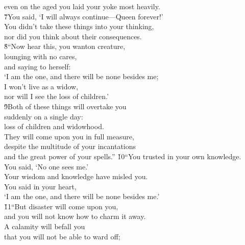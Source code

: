 \begin{poetry}
\poemlll       even on the aged you laid your yoke most heavily. \\
\poeml \v{7}You said, `I will always continue---Queen forever!' \\
\poemll    You didn't take these things into your thinking, \\
\poemlll       nor did you think about their consequences. \\
\poeml \v{8}``Now hear this, you wanton creature, \\
\poemll    lounging with no cares, \\
\poeml and saying to herself: \\
\poemll    `I am the one, and there will be none besides me; \\
\poeml I won't live as a widow, \\
\poemll    nor will I see the loss of children.' \\
\poeml \v{9}Both of these things will overtake you \\
\poemll    suddenly on a single day: \\
\poeml loss of children and widowhood. \\
\poemll    They will come upon you in full measure, \\
\poeml despite the multitude of your incantations \\
\poemll    and the great power of your spells.''
\poeml \v{10}``You trusted in your own knowledge. \\
\poemll    You said, `No one sees me.' \\
\poeml Your wisdom and knowledge have misled you. \\
\poemll    You said in your heart, \\
\poemlll       `I am the one, and there will be none besides me.' \\
\poeml \v{11}``But disaster will come upon you, \\
\poemll    and you will not know how to charm it away. \\
\poeml A calamity will befall you \\
\poemll    that you will not be able to ward off; \\

\end{poetry}

